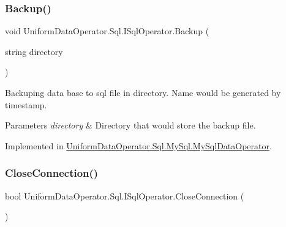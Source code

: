 \mbox{\label{interface_uniform_data_operator_1_1_sql_1_1_i_sql_operator_a096be4f746c1fcbb8b2894c2517b937c}} 
\subsubsection{\texorpdfstring{Backup()}{Backup()}}
{\footnotesize\ttfamily void Uniform\+Data\+Operator.\+Sql.\+I\+Sql\+Operator.\+Backup (\begin{DoxyParamCaption}\item[{string}]{directory }\end{DoxyParamCaption})}



Backuping data base to sql file in directory. Name would be generated by timestamp. 


\begin{DoxyParams}{Parameters}
{\em directory} & Directory that would store the backup file.\\
\hline
\end{DoxyParams}


Implemented in \mbox{\hyperlink{class_uniform_data_operator_1_1_sql_1_1_my_sql_1_1_my_sql_data_operator_a0dbd58206733a17dd26143b58d0859d7}{Uniform\+Data\+Operator.\+Sql.\+My\+Sql.\+My\+Sql\+Data\+Operator}}.

\mbox{\label{interface_uniform_data_operator_1_1_sql_1_1_i_sql_operator_a1a6429996e1bbb452f4e034fd634e640}} 
\subsubsection{\texorpdfstring{Close\+Connection()}{CloseConnection()}}
{\footnotesize\ttfamily bool Uniform\+Data\+Operator.\+Sql.\+I\+Sql\+Operator.\+Close\+Connection (\begin{DoxyParamCaption}{ }\end{DoxyParamCaption})}



